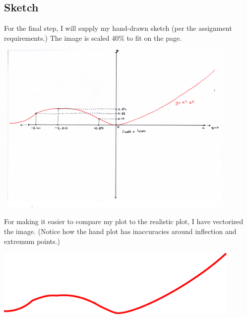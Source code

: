 \subsection{Sketch}

For the final step, I will supply my hand-drawn sketch (per the assignment
requirements.)
The image is scaled 40\% to fit on the page.

\begin{center}
    \includegraphics[width=118.8mm, height=84mm]{hand/scan.png}
\end{center}

For making it easier to compare my plot to the realistic plot, I have
vectorized the image. (Notice how the hand plot has inaccuracies around 
inflection and extremum points.)

\begin{center}
    \includegraphics[width=118.8mm]{hand/vector.eps}
\end{center}